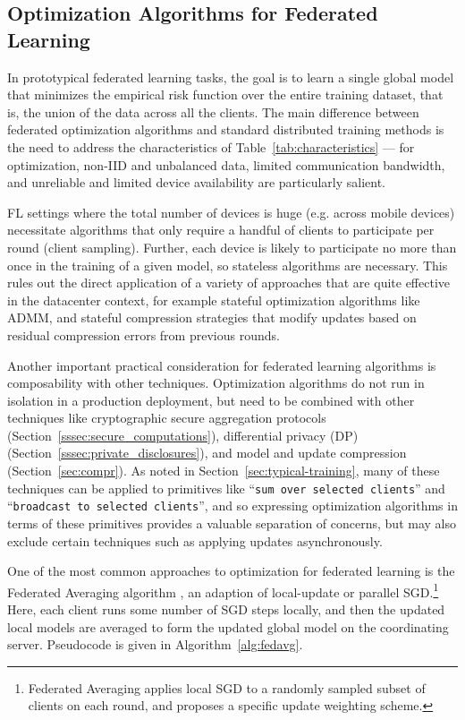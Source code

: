 \documentclass[11pt]{article}
\begin{document}
\subsection{Optimization Algorithms for Federated Learning}\label{sec:optimization}

In prototypical federated learning tasks, the goal is to learn a single global model that minimizes the empirical risk function over the entire training dataset, that is, the union of the data across all the clients. The main difference between federated optimization algorithms and standard distributed training methods 
is the need to address the characteristics of Table~\ref{tab:characteristics} --- for optimization, non-IID and unbalanced data, limited communication bandwidth, and unreliable and limited device availability are particularly salient. 

FL settings where the total number of devices is huge (e.g. across mobile devices) necessitate algorithms that only require a handful of clients to participate per round (client sampling). Further, each device is likely to participate no more than once in the training of a given model, so stateless algorithms are necessary. This rules out the direct application of a variety of approaches that are quite effective in the datacenter context, for example stateful optimization algorithms like ADMM, and stateful compression strategies that modify updates based on residual compression errors from previous rounds.

Another important practical consideration for federated learning algorithms is composability with other techniques. Optimization algorithms do not run in isolation in a production deployment, but need to be combined with other techniques like cryptographic secure aggregation protocols (Section~\ref{sssec:secure_computations}), differential privacy (DP) (Section~\ref{sssec:private_disclosures}), and model and update compression (Section~\ref{sec:compr}). As noted in Section~\ref{sec:typical-training}, many of these techniques can be applied to primitives like ``\texttt{sum over selected clients}'' and ``\texttt{broadcast to selected clients}'', and so expressing optimization algorithms in terms of these primitives provides a  valuable separation of concerns, but may also exclude certain techniques such as applying updates asynchronously.

One of the most common approaches to optimization for federated learning is the Federated Averaging algorithm \citep{mcmahan17fedavg}, an adaption of local-update or parallel SGD.\footnote{Federated Averaging applies local SGD to a randomly sampled subset of clients on each round, and proposes a specific update weighting scheme.} Here, each client runs some number of SGD steps locally, and then the updated local models are averaged to form the updated global model on the coordinating server. Pseudocode is given in Algorithm~\ref{alg:fedavg}.
\end{document}
